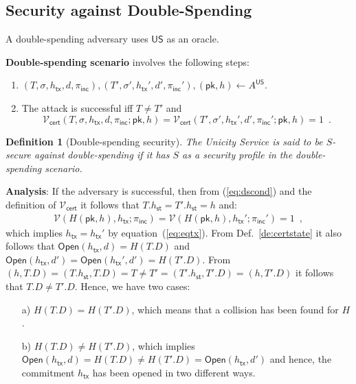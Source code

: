 \documentclass{article}
\newtheorem{definition}{Definition}[section]
\newcommand{\pubkey}[0]{\mathsf{pk}}
\newcommand{\open}[0]{\mathsf{Open}}
\newcommand{\unisrv}[0]{\mathsf{US}}
\newcommand{\sthash}[0]{h_\mathsf{st}}
\newcommand{\txhash}[0]{h_\mathsf{tx}}
\newcommand{\univer}[0]{\mathcal{V}}
\newcommand{\certver}[0]{\mathcal{V}_\mathsf{cert}}
\newcommand{\pinc}[0]{\pi_{\mathsf{inc}}}
\begin{document}
\subsection{Security against Double-Spending}

A double-spending adversary uses $\unisrv$ as an oracle. \medskip

\noindent\textbf{Double-spending scenario} involves the following steps:
\begin{enumerate}
\item $(T,\sigma,\txhash,d,\pinc),(T',\sigma',\txhash',d',\pinc'),(\pubkey,h)\gets A^\unisrv$.
\item The attack is successful iff $T\neq T'$ and
\begin{equation}\label{eq:dscond}
\certver(T,\sigma,\txhash,d,\pinc;\pubkey,h)=\certver(T',\sigma',\txhash',d',\pinc';\pubkey,h)=1 \enspace.
\end{equation}
\end{enumerate}

\begin{definition}[Double-spending security]
The Unicity Service is said to be $S$-secure against double-spending if it has $S$ as a security profile in the double-spending scenario.
\end{definition}

\noindent\textbf{Analysis}: If the adversary is successful, then
from (\ref{eq:dscond}) and the definition of $\certver$ it follows that
$T.\sthash = T'.\sthash=h$ and:
\begin{eqnarray*}
\univer(H(\pubkey, h), \txhash; \pinc) = \univer(H(\pubkey, h), \txhash'; \pinc') = 1\enspace,
\end{eqnarray*}
which implies $\txhash=\txhash'$ by equation~(\ref{eq:eqtx}).
From Def.~\ref{de:certstate} it also follows that
$\open(\txhash,d)=H(T.D)$ and $\open(\txhash,d')=\open(\txhash',d')=H(T'.D)$.
From $(h,T.D)=(T.\sthash,T.D)=T\neq T'=(T'.\sthash,T'.D)=(h,T'.D)$ it follows that $T.D\neq T'.D$. Hence, we have two cases:
\begin{itemize}
\item[a)] $H(T.D)=H(T'.D)$, which
means that a collision has been found for $H$.
\item[b)] $H(T.D)\neq H(T'.D)$, which implies $\open(\txhash,d)=H(T.D)\neq H(T'.D)=\open(\txhash,d')$ and hence, the commitment $\txhash$ has been opened in two different ways.
\end{itemize}
\end{document}
